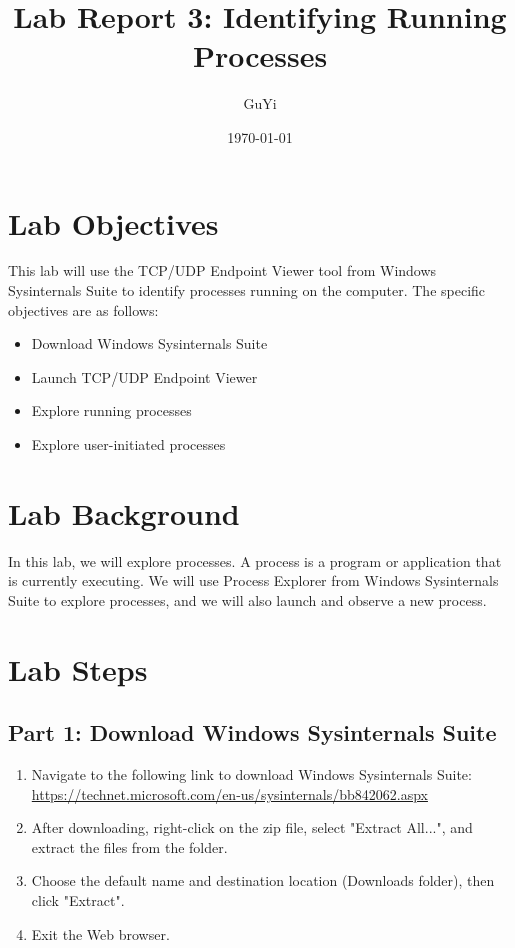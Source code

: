 \documentclass[12pt,a4paper]{article}
\title{Lab Report 3: Identifying Running Processes}
\author{GuYi}
\date{\today}
\begin{document}
\maketitle

\section{Lab Objectives}

This lab will use the TCP/UDP Endpoint Viewer tool from Windows Sysinternals Suite to identify processes running on the computer. The specific objectives are as follows:

\begin{itemize}
    \item Download Windows Sysinternals Suite
    \item Launch TCP/UDP Endpoint Viewer
    \item Explore running processes
    \item Explore user-initiated processes
\end{itemize}

\section{Lab Background}

In this lab, we will explore processes. A process is a program or application that is currently executing. We will use Process Explorer from Windows Sysinternals Suite to explore processes, and we will also launch and observe a new process.

\section{Lab Steps}

\subsection{Part 1: Download Windows Sysinternals Suite}

\begin{enumerate}
    \item Navigate to the following link to download Windows Sysinternals Suite:\\
    \url{https://technet.microsoft.com/en-us/sysinternals/bb842062.aspx}
    \item After downloading, right-click on the zip file, select "Extract All...", and extract the files from the folder.
    \item Choose the default name and destination location (Downloads folder), then click "Extract".
    \item Exit the Web browser.
\end{enumerate}
\end{document}
